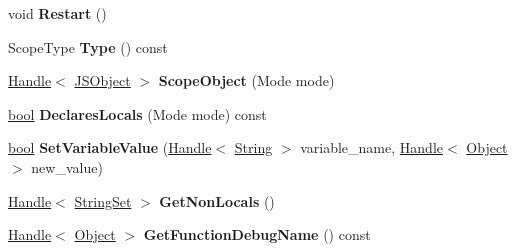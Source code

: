 \begin{DoxyCompactItemize}
\mbox{\label{classv8_1_1internal_1_1ScopeIterator_af25c584be732d14796c40dbe1a85c171}} 
void {\bfseries Restart} ()
\item 
\mbox{\label{classv8_1_1internal_1_1ScopeIterator_a51e0c1201f011191ac3a5ad1ed2fd59b}} 
Scope\+Type {\bfseries Type} () const
\item 
\mbox{\label{classv8_1_1internal_1_1ScopeIterator_a07d266a915b7450709f23c56c5e8a05b}} 
\mbox{\hyperlink{classv8_1_1internal_1_1Handle}{Handle}}$<$ \mbox{\hyperlink{classv8_1_1internal_1_1JSObject}{J\+S\+Object}} $>$ {\bfseries Scope\+Object} (Mode mode)
\item 
\mbox{\label{classv8_1_1internal_1_1ScopeIterator_a057a1669d94e05d85b396db58fac86d2}} 
\mbox{\hyperlink{classbool}{bool}} {\bfseries Declares\+Locals} (Mode mode) const
\item 
\mbox{\label{classv8_1_1internal_1_1ScopeIterator_a75b041ba4a4d017daea66327308f52fb}} 
\mbox{\hyperlink{classbool}{bool}} {\bfseries Set\+Variable\+Value} (\mbox{\hyperlink{classv8_1_1internal_1_1Handle}{Handle}}$<$ \mbox{\hyperlink{classv8_1_1internal_1_1String}{String}} $>$ variable\+\_\+name, \mbox{\hyperlink{classv8_1_1internal_1_1Handle}{Handle}}$<$ \mbox{\hyperlink{classv8_1_1internal_1_1Object}{Object}} $>$ new\+\_\+value)
\item 
\mbox{\label{classv8_1_1internal_1_1ScopeIterator_a21b06d8bae4b550e6ab8e40e8d4df03a}} 
\mbox{\hyperlink{classv8_1_1internal_1_1Handle}{Handle}}$<$ \mbox{\hyperlink{classv8_1_1internal_1_1StringSet}{String\+Set}} $>$ {\bfseries Get\+Non\+Locals} ()
\item 
\mbox{\label{classv8_1_1internal_1_1ScopeIterator_a0834abbe5bc848c2a0471454fc933196}} 
\mbox{\hyperlink{classv8_1_1internal_1_1Handle}{Handle}}$<$ \mbox{\hyperlink{classv8_1_1internal_1_1Object}{Object}} $>$ {\bfseries Get\+Function\+Debug\+Name} () const
\item 
\mbox{\label{classv8_1_1internal_1_1ScopeIterator_ad6d8402d0de6e4249c6836d3ab3abbbc}} 

\end{DoxyCompactItemize}
